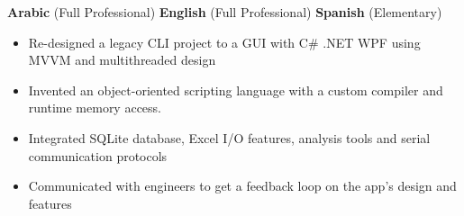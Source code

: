 \documentclass[11pt,a4paper,ragged2e]{altacv}
\begin{document}
\begin{paracol}{1}
\\ \vspace{0.1em}
 \\
\vspace{-0.15\baselineskip}
\tightdivider \\
 \smallskip \\
\tightdivider \\

\textbf{Arabic} (Full Professional) \hfill \textbf{English} (Full Professional) \hfill \textbf{Spanish} (Elementary)



{}

\begin{itemize}
\item Re-designed a legacy CLI project to a GUI with C\# .NET WPF using MVVM and multithreaded design
\item Invented an object-oriented scripting language with a custom compiler and runtime memory access.
\item Integrated SQLite database, Excel I/O features, analysis tools and serial communication protocols 
\item Communicated with engineers to get a feedback loop on the app's design and features
\end{itemize}


\end{paracol}
\end{document}
